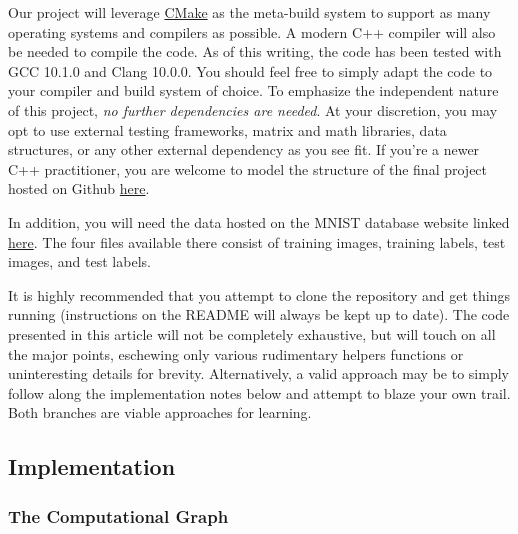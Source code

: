 \documentclass[
]{article}
\begin{document}
Our project will leverage \href{https://cmake.org}{CMake} as the
meta-build system to support as many operating systems and compilers as
possible. A modern C++ compiler will also be needed to compile the code.
As of this writing, the code has been tested with GCC 10.1.0 and Clang
10.0.0. You should feel free to simply adapt the code to your compiler
and build system of choice. To emphasize the independent nature of this
project, \emph{no further dependencies are needed}. At your discretion,
you may opt to use external testing frameworks, matrix and math
libraries, data structures, or any other external dependency as you see
fit. If you're a newer C++ practitioner, you are welcome to model the
structure of the final project hosted on Github
\href{https://github.com/jeremyong/nn_in_a_weekend}{here}.

In addition, you will need the data hosted on the MNIST database website
linked \href{http://yann.lecun.com/exdb/mnist/}{here}. The four files
available there consist of training images, training labels, test
images, and test labels.

It is highly recommended that you attempt to clone the repository and
get things running (instructions on the README will always be kept up to
date). The code presented in this article will not be completely
exhaustive, but will touch on all the major points, eschewing only
various rudimentary helpers functions or uninteresting details for
brevity. Alternatively, a valid approach may be to simply follow along
the implementation notes below and attempt to blaze your own trail. Both
branches are viable approaches for learning.

\hypertarget{implementation}{%
\subsection{Implementation}\label{implementation}}

\hypertarget{the-computational-graph}{%
\subsubsection{The Computational Graph}\label{the-computational-graph}}
\end{document}
